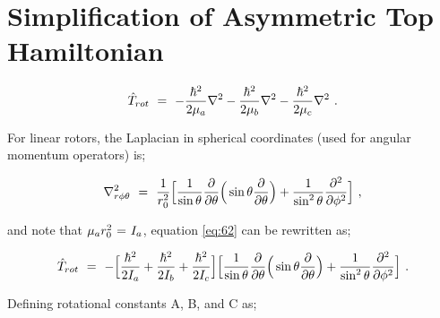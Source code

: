 \documentclass{ece}
\begin{document}
\section{Simplification of Asymmetric Top Hamiltonian}
\label{app:Eappx}

\begin{equation} \label{eq:62}
\hat{T}_{rot} \hspace{0.125cm} = \hspace{0.125cm} - \frac{\hbar^2}{2 \mu_{a}} \nabla^2 - \frac{\hbar^2}{2 \mu_{b}} \nabla^2 - \frac{\hbar^2}{2 \mu_{c}} \nabla^2 \hspace{0.125cm} .
\end{equation}

For linear rotors, the Laplacian in spherical coordinates (used for angular momentum operators) is;

\begin{equation} \label{eq:63}
\nabla^{2}_{r \phi \theta} \hspace{0.125cm} = \hspace{0.125cm} \frac{1}{r^2_0} \Big[ \frac{1}{\sin{\theta}} \frac{\partial}{\partial{\theta}} \Big( \sin{\theta} \frac{\partial}{\partial{\theta}} \Big) + \frac{1}{\sin^2 \theta} \frac{\partial^2}{\partial{\phi}^2} \Big] \hspace{0.125cm} ,
\end{equation}

and note that \begin{math} \mu_a r^2_0 \hspace{0.025cm} = \hspace{0.025cm} I_a \end{math}, equation \ref{eq:62} can be rewritten as;

\vspace{-0.25cm}

\begin{equation} \label{eq:64}
\hat{T}_{rot} \hspace{0.125cm} = \hspace{0.125cm} - \Big[ \frac{\hbar^2}{2 I_{a}} + \frac{\hbar^2}{2 I_{b}} + \frac{\hbar^2}{2 I_{c}} \Big] \Big[ \frac{1}{\sin{\theta}} \frac{\partial}{\partial{\theta}} \Big( \sin{\theta} \frac{\partial}{\partial{\theta}} \Big) + \frac{1}{\sin^2 \theta} \frac{\partial^2}{\partial{\phi}^2} \Big] \hspace{0.125cm} .
\end{equation}

Defining rotational constants A, B, and C as;
\end{document}
